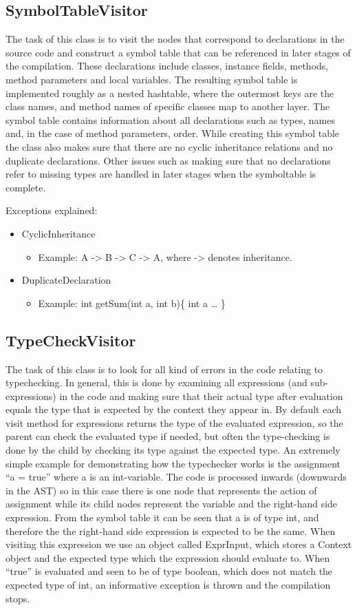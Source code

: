 \documentclass[paper=a4, fontsize=11pt]{scrartcl} %
\numberwithin{equation}{section} %
\numberwithin{figure}{section} %
\numberwithin{table}{section} %
\begin{document}
\subsection{SymbolTableVisitor}
The task of this class is to visit the nodes that correspond to declarations in the source code and construct a symbol table that can be referenced in later stages of the compilation. These declarations include classes, instance fields, methods, method parameters and local variables. The resulting symbol table is implemented roughly as a nested hashtable, where the outermost keys are the class names, and method names of specific classes map to another layer. The symbol table contains information about all declarations such as types, names and, in the case of method parameters, order. While creating this symbol table the class also makes sure that there are no cyclic inheritance relations and no duplicate declarations. Other issues such as making sure that no declarations refer to missing types are handled in later stages when the symboltable is complete.

Exceptions explained:
\begin{itemize}
  \item{CyclicInheritance}
  \begin{itemize}
    \item{Example: A -> B -> C -> A, where -> denotes inheritance.}
  \end{itemize}
  \item{DuplicateDeclaration}
  \begin{itemize}
    \item{Example: int getSum(int a, int b)\{ int a … \}}
  \end{itemize}
\end{itemize}
\subsection{TypeCheckVisitor}
The task of this class is to look for all kind of errors in the code relating to typechecking. In general, this is done by examining all expressions (and sub-expressions) in the code and making sure that their actual type after evaluation equals the type that is expected by the context they appear in. By default each visit method for expressions returns the type of the evaluated expression, so the parent can check the evaluated type if needed, but often the type-checking is done by the child by checking its type against the expected type. An extremely simple example for demonstrating how the typechecker works is the assignment “a = true” where a is an int-variable. The code is processed inwards (downwards in the AST) so in this case there is one node that represents the action of assignment while its child nodes represent the variable and the right-hand side expression. From the symbol table it can be seen that a is of type int, and therefore the the right-hand side expression is expected to be the same. When visiting this expression we use an object called ExprInput, which stores a Context object and the expected type which the expression should evaluate to. When “true” is evaluated and seen to be of type boolean, which does not match the expected type of int, an informative exception is thrown and the compilation stops.
\end{document}
